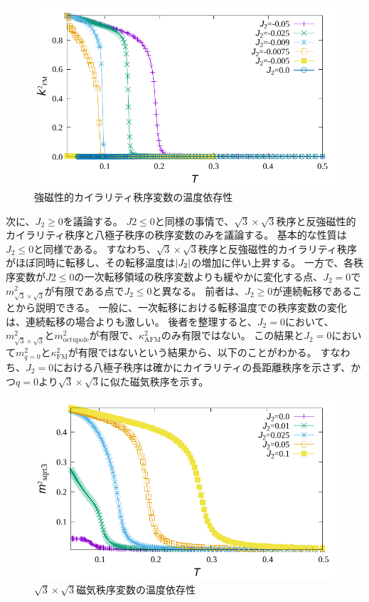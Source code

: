 \documentclass[12pt,titlepage,dvipdfmx]{jarticle}
\begin{document}
\begin{figure}[H]
   \centering
   \includegraphics[width=12cm]{figure/fvc.pdf}
   \caption{強磁性的カイラリティ秩序変数の温度依存性}
\end{figure}

次に、$J_2\ge0$を議論する。
$J2\le0$と同様の事情で、$\sqrt{3}\times\sqrt{3}$秩序と反強磁性的カイラリティ秩序と八極子秩序の秩序変数のみを議論する。
基本的な性質は$J_2\le0$と同様である。
すなわち、$\sqrt{3}\times\sqrt{3}$秩序と反強磁性的カイラリティ秩序がほぼ同時に転移し、その転移温度は$\abs{J_2}$の増加に伴い上昇する。
一方で、各秩序変数が$J2\le0$の一次転移領域の秩序変数よりも緩やかに変化する点、$J_2=0$で$m^2_{\sqrt{3}\times\sqrt{3}}$が有限である点で$J_2\le0$と異なる。
前者は、$J_2\ge0$が連続転移であることから説明できる。
一般に、一次転移における転移温度での秩序変数の変化は、連続転移の場合よりも激しい。
後者を整理すると、$J_2=0$において、$m^2_{\sqrt{3}\times\sqrt{3}}$と$m^2_{\mathrm{octupole}}$が有限で、$\kappa^2_{\mathrm{AFM}}$のみ有限ではない。
この結果と$J_2=0$において$m^2_{q=0}$と$\kappa^2_{\mathrm{FM}}$が有限ではないという結果から、以下のことがわかる。
すなわち、$J_2=0$における八極子秩序は確かにカイラリティの長距離秩序を示さず、かつ$q=0$より$\sqrt{3}\times\sqrt{3}$に似た磁気秩序を示す。


\begin{figure}[H]
   \centering
   \includegraphics[width=12cm]{figure/mq_sqrt3.pdf}
   \caption{$\sqrt{3}\times\sqrt{3}$磁気秩序変数の温度依存性}
\end{figure}
\end{document}
